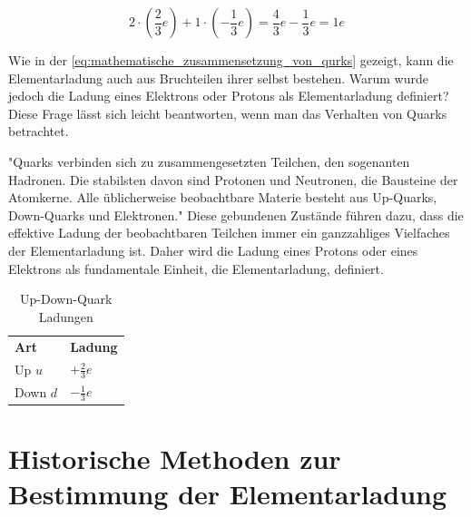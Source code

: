 \begin{equation}\label{eq:mathematische_zusammensetzung_von_qurks}
	2 \cdot \left(\frac{2}{3}e\right)  + 1 \cdot \left( -\frac{1}{3}e\right) 
	= \frac{4}{3}e - \frac{1}{3}e = 1e
\end{equation}

\noindent Wie in der \autoref{eq:mathematische_zusammensetzung_von_qurks} gezeigt, kann die Elementarladung auch aus Bruchteilen ihrer selbst bestehen. Warum wurde jedoch die Ladung eines Elektrons oder Protons als Elementarladung definiert? Diese Frage lässt sich leicht beantworten, wenn man das Verhalten von Quarks betrachtet.

"Quarks verbinden sich zu zusammengesetzten Teilchen, den sogenanten Hadronen. Die stabilsten davon sind Protonen und Neutronen, die Bausteine der Atomkerne. Alle üblicherweise beobachtbare Materie besteht aus Up-Quarks, Down-Quarks und Elektronen." \parencite{enwiki:1263773841} Diese gebundenen Zustände führen dazu, dass die effektive Ladung der beobachtbaren Teilchen immer ein ganzzahliges Vielfaches der Elementarladung ist. Daher wird die Ladung eines Protons oder eines Elektrons als fundamentale Einheit, die Elementarladung, definiert. 


\begin{table}[ht]
	\centering
	\renewcommand{\arraystretch}{1.5} %
	\begin{tabular}{>{\centering\arraybackslash}m{3cm}|>{\centering\arraybackslash}m{3cm}}
		\multicolumn{2}{c}{\textit{\textbf{Quark Tabelle}}} \\
		\hline
		\textbf{Art} & \textbf{Ladung} \\
		\hline
		Up \( u \) & \( + \frac{2}{3}e \) \\
		Down \( d \) & \( - \frac{1}{3}e \) \\
		\hline
	\end{tabular}
	\caption{Up-Down-Quark Ladungen}
	\label{tab:quark_tabelle}
\end{table}

\section[Historische Methoden]{Historische Methoden zur Bestimmung der Elementarladung}
